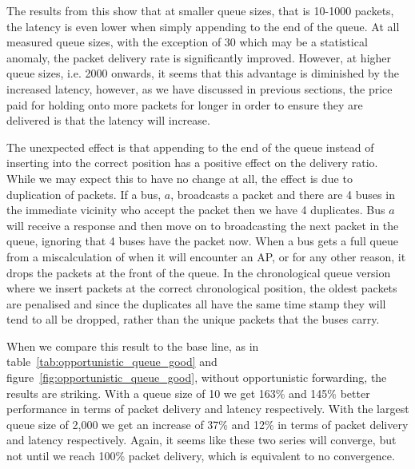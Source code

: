         The results from this show that at smaller queue sizes, that is 10-1000 packets, the latency is even lower when simply appending to the end of the queue. At all measured queue sizes, with the exception of 30 which may be a statistical anomaly, the packet delivery rate is significantly improved. However, at higher queue sizes, i.e. 2000 onwards, it seems that this advantage is diminished by the increased latency, however, as we have discussed in previous sections, the price paid for holding onto more packets for longer in order to ensure they are delivered is that the latency will increase. 

        The unexpected effect is that appending to the end of the queue instead of inserting into the correct position has a positive effect on the delivery ratio. While we may expect this to have no change at all, the effect is due to duplication of packets. If a bus, $a$, broadcasts a packet and there are 4 buses in the immediate vicinity who accept the packet then we have 4 duplicates. Bus $a$ will receive a response and then move on to broadcasting the next packet in the queue, ignoring that 4 buses have the packet now. When a bus gets a full queue from a miscalculation of when it will encounter an AP, or for any other reason, it drops the packets at the front of the queue. In the chronological queue version where we insert packets at the correct chronological position, the oldest packets are penalised and since the duplicates all have the same time stamp they will tend to all be dropped, rather than the unique packets that the buses carry. 

        When we compare this result to the base line, as in table~\ref{tab:opportunistic_queue_good} and figure~\ref{fig:opportunistic_queue_good}, without opportunistic forwarding, the results are striking. With a queue size of 10 we get 163\% and 145\% better performance in terms of packet delivery and latency respectively. With the largest queue size of 2,000 we get an increase of 37\% and 12\% in terms of packet delivery and latency respectively. Again, it seems like these two series will converge, but not until we reach 100\% packet delivery, which is equivalent to no convergence.

